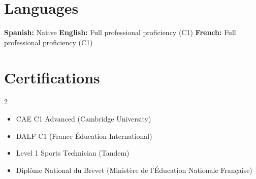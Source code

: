 \documentclass[10pt,letterpaper]{article}
\newcommand{\BulletGap}{0.12em}
\begin{document}
\section{Languages}
\vspace{0.3em}
\textbf{Spanish:} Native \hfill \textbf{English:} Full professional proficiency (C1) \hfill \textbf{French:} Full professional proficiency (C1)

\section{Certifications}
\vspace{-0.8em}
\begin{multicols}{2}
\begin{itemize}[itemsep=\BulletGap, topsep=0em, parsep=0pt, partopsep=0pt]
  \item CAE C1 Advanced (Cambridge University)
  \item DALF C1 (France Éducation International)
  \item Level 1 Sports Technician (Tandem)
  \item Dipl\^ome National du Brevet (Ministère de l’Éducation Nationale Française)
\end{itemize}
\end{multicols}
\end{document}
